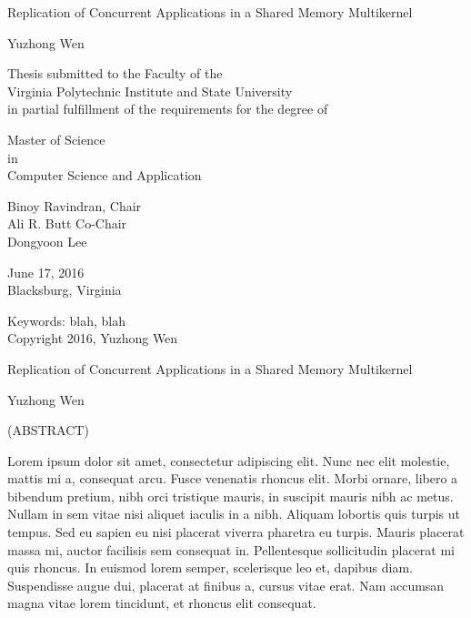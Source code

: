 \documentclass[12pt,dvips]{report}
\begin{document}
\thispagestyle{empty}
\begin{center}

{\Large 
Replication of Concurrent Applications in a Shared Memory Multikernel
}

\vfill

Yuzhong Wen

\vfill

Thesis submitted to the Faculty of the \\
Virginia Polytechnic Institute and State University \\
in partial fulfillment of the requirements for the degree of

\vfill

Master of Science \\
in \\
Computer Science and Application

\vfill

Binoy Ravindran, Chair \\
Ali R. Butt Co-Chair \\
Dongyoon Lee

\vfill

June 17, 2016 \\
Blacksburg, Virginia

\vfill

Keywords: blah, blah
\\
Copyright 2016, Yuzhong Wen

\end{center}

\pagebreak

\thispagestyle{empty}
\begin{center}

{\large Replication of Concurrent Applications in a Shared Memory Multikernel}

\vfill

Yuzhong Wen

\vfill

(ABSTRACT)

\vfill

\end{center}

Lorem ipsum dolor sit amet, consectetur adipiscing elit. Nunc nec elit molestie, mattis mi a, consequat arcu. Fusce venenatis rhoncus elit. Morbi ornare, libero a bibendum pretium, nibh orci tristique mauris, in suscipit mauris nibh ac metus. Nullam in sem vitae nisi aliquet iaculis in a nibh. Aliquam lobortis quis turpis ut tempus. Sed eu sapien eu nisi placerat viverra pharetra eu turpis. Mauris placerat massa mi, auctor facilisis sem consequat in. Pellentesque sollicitudin placerat mi quis rhoncus. In euismod lorem semper, scelerisque leo et, dapibus diam. Suspendisse augue dui, placerat at finibus a, cursus vitae erat. Nam accumsan magna vitae lorem tincidunt, et rhoncus elit consequat.
\end{document}
